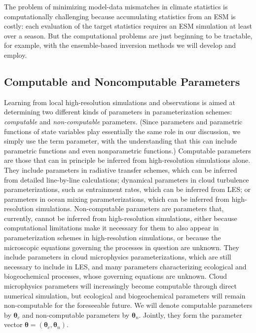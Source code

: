\documentclass{article}
\renewcommand{\vec}[1]{\boldsymbol{{#1}}}
\begin{document}
The problem of minimizing model-data mismatches in climate statistics is computationally challenging because accumulating statistics from an ESM is costly: each evaluation of the target statistics requires an ESM simulation at least over a season. But the computational problems are just beginning to be tractable, for example, with the ensemble-based inversion methods we will develop and employ.

\subsection{Computable and Noncomputable Parameters}

Learning from  local high-resolution simulations and observations is aimed at determining two different kinds of parameters in parameterization schemes: \emph{computable} and \emph{non-computable} parameters. (Since parameters and parametric functions of state variables play essentially the same role in our discussion, we simply use the term parameter, with the understanding that this can include parametric functions and even nonparametric functions.) Computable parameters are those that can in principle be inferred from high-resolution simulations alone. They include parameters in radiative transfer schemes, which can be inferred from detailed line-by-line calculations; dynamical parameters in cloud turbulence parameterizations, such as entrainment rates, which can be inferred from LES; or parameters in ocean mixing parameterizations, which can be inferred from high-resolution simulations. Non-computable parameters are parameters that, currently, cannot be inferred from high-resolution simulations, either because computational limitations make it necessary for them to also appear in parameterization schemes in high-resolution simulations, or because the microscopic equations governing the processes in question are unknown. They include parameters in cloud microphysics parameterizations, which are still necessary to include in LES, and many parameters characterizing ecological and biogeochemical processes, whose governing equations are unknown. Cloud microphysics parameters will increasingly become computable through direct numerical simulation, but ecological and biogeochemical parameters will remain non-computable for the foreseeable future. We will denote computable parameters by $\vec{\theta}_c$ and non-computable parameters by $\vec{\theta}_n$. Jointly, they form the parameter vector $\vec{\theta}=(\vec{\theta}_c, \vec{\theta}_n)$.
\end{document}
